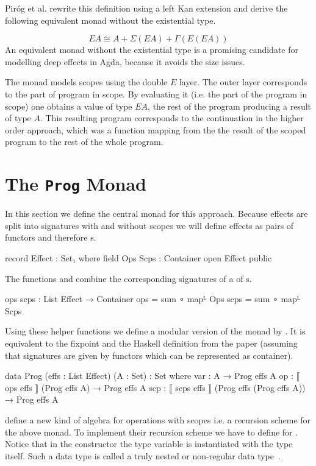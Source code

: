 Piróg et al. rewrite this definition using a left Kan extension and derive the
following equivalent monad without the existential type.

\[
  EA \cong A + \Sigma{}(EA) + \Gamma{}(E(EA))
\]
An equivalent monad without the existential type is a promising candidate for
modelling deep effects in Agda, because it avoids the size issues.

The monad models scopes using the double $E$ layer.
The outer layer corresponds to the part of program in scope.
By evaluating it (i.e. the part of the program in scope) one obtains a value of
type $EA$, the rest of the program producing a result of type $A$.
This resulting program corresponds to the continuation in the higher order
approach, which was a function mapping from the the result of the scoped program
to the rest of the whole program.

\section{The \texttt{Prog} Monad}

In this section we define the central monad for this approach.
Because effects are split into signatures with and without scopes we will define
effects as pairs of functors and therefore s.

\begin{code}
record Effect : Set₁ where
  field
    Ops Scps : Container
open Effect public
\end{code}
The functions  and  combine the
corresponding signatures of a  of s.

\begin{code}
ops scps : List Effect → Container
ops   = sum ∘ mapᴸ Ops
scps  = sum ∘ mapᴸ Scps
\end{code}
Using these helper functions we define a modular version of the monad by
\textcite{DBLP:conf/lics/PirogSWJ18}.
It is equivalent to the fixpoint and the Haskell definition from the paper
(assuming that signatures are given by functors which can be represented as
container).

\begin{code}
data Prog (effs : List Effect) (A : Set) : Set where
  var  :  A                                          → Prog effs A
  op   :  ⟦ ops   effs  ⟧ (Prog effs A)              → Prog effs A
  scp  :  ⟦ scps  effs  ⟧ (Prog effs (Prog effs A))  → Prog effs A
\end{code}
\textcite{DBLP:conf/lics/PirogSWJ18} define a new kind of algebra for operations
with scopes i.e. a recursion scheme for the above monad.
To implement their recursion scheme we have to define \AgdaFunction{>>=} for 
\AgdaSpace{}\AgdaSpace{}.
Notice that in the  constructor the type variable
 is instantiated with the type 
\AgdaSpace{}\AgdaSpace{}
itself.
Such a data type is called a truly nested or non-regular data
type~\cite{DBLP:conf/mpc/BirdM98}.

